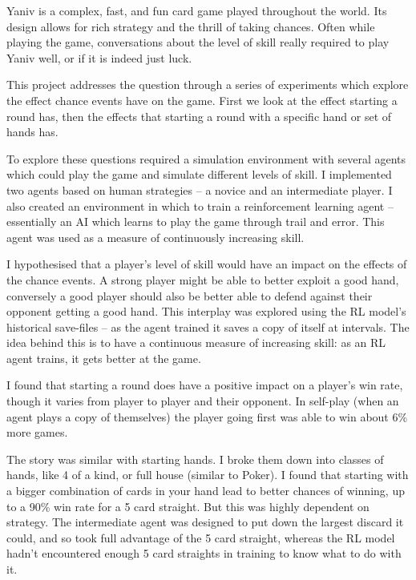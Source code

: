 \documentclass[../main.tex]{subfiles}
\begin{document}
\begin{summary}

Yaniv is a complex, fast, and fun card game played throughout the world. Its design allows for rich strategy and the thrill of taking chances. Often while playing the game, conversations about the level of skill really required to play Yaniv well, or if it is indeed just luck. 

This project addresses the question through a series of experiments which explore the effect chance events have on the game. First we look at the effect starting a round has, then the effects that starting a round with a specific hand or set of hands has. 

To explore these questions required a simulation environment with several agents which could play the game and simulate different levels of skill. I implemented two agents based on human strategies -- a novice and an intermediate player. I also created an environment in which to train a reinforcement learning agent -- essentially an AI which learns to play the game through trail and error. This agent was used as a measure of continuously increasing skill. 

I hypothesised that a player's level of skill would have an impact on the effects of the chance events. A strong player might be able to better exploit a good hand, conversely a good player should also be better able to defend against their opponent getting a good hand. This interplay was explored using the RL model's historical save-files -- as the agent trained it saves a copy of itself at intervals. The idea behind this is to have a continuous measure of increasing skill: as an RL agent trains, it gets better at the game. 

I found that starting a round does have a positive impact on a player's win rate, though it varies from player to player and their opponent. In self-play (when an agent plays a copy of themselves) the player going first was able to win about 6\% more games. 

The story was similar with starting hands. I broke them down into classes of hands, like 4 of a kind, or full house (similar to Poker). I found that starting with a bigger combination of cards in your hand lead to better chances of winning, up to a 90\% win rate for a 5 card straight. But this was highly dependent on strategy. The intermediate agent was designed to put down the largest discard it could, and so took full advantage of the 5 card straight, whereas the RL model hadn't encountered enough 5 card straights in training to know what to do with it. 


\end{summary}
\end{document}
